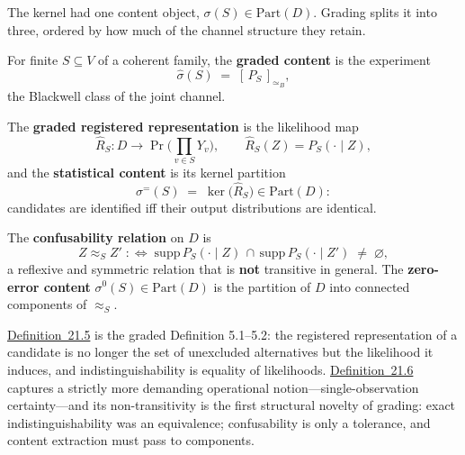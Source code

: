 
The kernel had one content object, \(\sigma(S) \in \mathrm{Part}(D)\). Grading splits it into three, ordered by how much of the channel structure they retain.

\begin{thmdef}

For finite \(S \subseteq V\) of a coherent family, the \textbf{graded content} is the experiment
\[
\widehat{\sigma}(S) \;=\; [\,P_S\,]_{\simeq_B},
\]
the Blackwell class of the joint channel.
\end{thmdef}

\begin{thmdef}

The \textbf{graded registered representation} is the likelihood map
\[
\widehat{R}_S : D \to \Pr\Big(\textstyle\prod_{v \in S} Y_v\Big), \qquad \widehat{R}_S(Z) = P_S(\cdot \mid Z),
\]
and the \textbf{statistical content} is its kernel partition
\[
\sigma^{=}(S) \;=\; \ker\big(\widehat{R}_S\big) \in \mathrm{Part}(D):
\]
candidates are identified iff their output distributions are identical.
\end{thmdef}

\begin{thmdef}

The \textbf{confusability relation} on \(D\) is
\[
Z \approx_S Z' \;:\iff\; \mathrm{supp}\, P_S(\cdot \mid Z) \,\cap\, \mathrm{supp}\, P_S(\cdot \mid Z') \;\ne\; \varnothing,
\]
a reflexive and symmetric relation that is \textbf{not} transitive in general. The \textbf{zero-error content} \(\sigma^{0}(S) \in \mathrm{Part}(D)\) is the partition of \(D\) into connected components of \(\approx_S\).
\end{thmdef}

\hyperlink{stmt:21.5}{Definition~21.5} is the graded Definition 5.1--5.2: the registered representation of a candidate is no longer the set of unexcluded alternatives but the likelihood it induces, and indistinguishability is equality of likelihoods. \hyperlink{stmt:21.6}{Definition~21.6} captures a strictly more demanding operational notion---\hspace{0pt}single-observation certainty---\hspace{0pt}and its non-transitivity is the first structural novelty of grading: exact indistinguishability was an equivalence; confusability is only a tolerance, and content extraction must pass to components.

